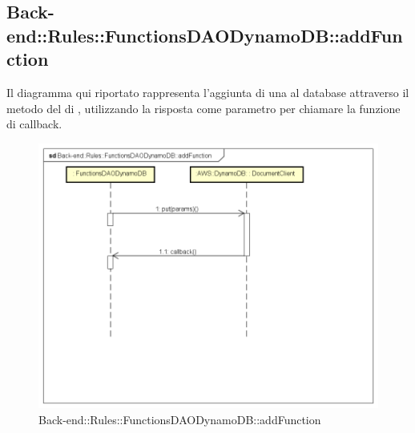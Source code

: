 \subsection{Back-end::Rules::FunctionsDAODynamoDB::addFunction}
Il diagramma qui riportato rappresenta l'aggiunta di una  al database attraverso il metodo  del  di , utilizzando la risposta come parametro per chiamare la funzione di callback.
 \begin{figure}[h] \centering \includegraphics[width=\textwidth,height=\textheight,keepaspectratio]{images/diagrams/back-end/Ufficial_Backend/Back-endRulesFunctionsDAODynamoDBaddFunction.png} 	\caption{Back-end::Rules::FunctionsDAODynamoDB::addFunction}
\end{figure}

\newpage
